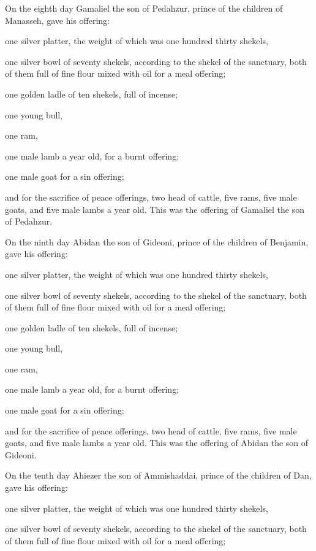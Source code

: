  On the eighth day Gamaliel the son of Pedahzur, prince
of the children of Manasseh,  gave his offering:

one silver platter, the weight of which was one hundred thirty shekels,

one silver bowl of seventy shekels, according to the shekel of the
sanctuary, both of them full of fine flour mixed with oil for a meal
offering;

 one golden ladle of ten shekels, full of incense;

 one young bull,

one ram,

one male lamb a year old, for a burnt offering;

 one male goat for a sin offering;

 and for the sacrifice of peace offerings, two head of
cattle, five rams, five male goats, and five male lambs a year old. This
was the offering of Gamaliel the son of Pedahzur.

 On the ninth day Abidan the son of Gideoni, prince of
the children of Benjamin,  gave his offering:

one silver platter, the weight of which was one hundred thirty shekels,

one silver bowl of seventy shekels, according to the shekel of the
sanctuary, both of them full of fine flour mixed with oil for a meal
offering;

 one golden ladle of ten shekels, full of incense;

 one young bull,

one ram,

one male lamb a year old, for a burnt offering;

 one male goat for a sin offering;

 and for the sacrifice of peace offerings, two head of
cattle, five rams, five male goats, and five male lambs a year old. This
was the offering of Abidan the son of Gideoni.

 On the tenth day Ahiezer the son of Ammishaddai, prince
of the children of Dan,  gave his offering:

one silver platter, the weight of which was one hundred thirty shekels,

one silver bowl of seventy shekels, according to the shekel of the
sanctuary, both of them full of fine flour mixed with oil for a meal
offering;

